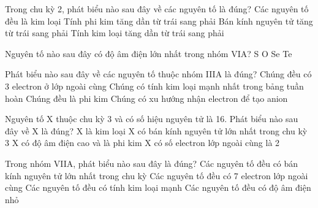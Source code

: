 \begin{ex}%
	Trong chu kỳ 2, phát biểu nào sau đây về các nguyên tố là đúng?
	\choice
	{Các nguyên tố đều là kim loại}
	{\True Tính phi kim tăng dần từ trái sang phải}
	{Bán kính nguyên tử tăng từ trái sang phải}
	{Tính kim loại tăng dần từ trái sang phải}
\end{ex}
\begin{ex}%
	Nguyên tố nào sau đây có độ âm điện lớn nhất trong nhóm VIA?
	\choice
	{S}
	{\True O}
	{Se}
	{Te}
\end{ex}
\begin{ex}%
	Phát biểu nào sau đây về các nguyên tố thuộc nhóm IIIA là đúng?
	\choice
	{\True Chúng đều có 3 electron ở lớp ngoài cùng}
	{Chúng có tính kim loại mạnh nhất trong bảng tuần hoàn}
	{Chúng đều là phi kim}
	{Chúng có xu hướng nhận electron để tạo anion}
\end{ex}
\begin{ex}%
	Nguyên tố X thuộc chu kỳ 3 và có số hiệu nguyên tử là 16. Phát biểu nào sau đây về X là đúng?
	\choice
	{X là kim loại}
	{X có bán kính nguyên tử lớn nhất trong chu kỳ 3}
	{\True X có độ âm điện cao và là phi kim}
	{X có số electron lớp ngoài cùng là 2}
\end{ex}
\begin{ex}%
	Trong nhóm VIIA, phát biểu nào sau đây là đúng?
	\choice
	{Các nguyên tố đều có bán kính nguyên tử lớn nhất trong chu kỳ}
	{\True Các nguyên tố đều có 7 electron lớp ngoài cùng}
	{Các nguyên tố đều có tính kim loại mạnh}
	{Các nguyên tố đều có độ âm điện nhỏ}
\end{ex}

